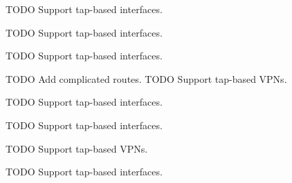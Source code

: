 
\begin{DoxyRefList}
\item[\label{todo__todo000003}%
\Hypertarget{todo__todo000003}%
Member \hyperlink{main_8c_a345bf2d3cf0cd82bcbbba3e054eafd48}{find\+\_\+primary\+\_\+if\+\_\+index} ()]T\+O\+DO Support tap-\/based interfaces. 
\item[\label{todo__todo000004}%
\Hypertarget{todo__todo000004}%
Member \hyperlink{main_8c_a6f5d8c51479e6196fb3d19e3538a46d0}{get\+\_\+if\+\_\+info} (struct ifaddrs $\ast$ifa, int family, enum I\+F\+\_\+\+T\+R\+A\+V\+E\+R\+S\+E\+\_\+\+M\+O\+DE tr\+\_\+mode)]T\+O\+DO Support tap-\/based interfaces. 
\item[\label{todo__todo000001}%
\Hypertarget{todo__todo000001}%
Member \hyperlink{app-profile_8c_a7ab4018359451259c67e57c83f9b7062}{get\+\_\+openvpn\+\_\+profile\+\_\+name} (char profile\+\_\+name\mbox{[}M\+A\+X\+\_\+\+V\+P\+N\+\_\+\+P\+R\+O\+F\+I\+L\+E\+\_\+\+N\+A\+ME\mbox{]})]T\+O\+DO Support tap-\/based interfaces. 
\item[\label{todo__todo000007}%
\Hypertarget{todo__todo000007}%
Member \hyperlink{main_8c_a25501fb2b3310a216de1ece7fa86e233}{get\+\_\+routes} ()]T\+O\+DO Add complicated routes. T\+O\+DO Support tap-\/based V\+P\+Ns. 
\item[\label{todo__todo000002}%
\Hypertarget{todo__todo000002}%
Member \hyperlink{app-profile_8c_aa32bea11cb1c8f99a45bc62cc8f5e455}{get\+\_\+vpn\+\_\+profile\+\_\+name} (enum V\+P\+N\+\_\+\+M\+E\+T\+H\+O\+DS vpn\+\_\+method, char profile\+\_\+name\mbox{[}M\+A\+X\+\_\+\+V\+P\+N\+\_\+\+P\+R\+O\+F\+I\+L\+E\+\_\+\+N\+A\+ME\mbox{]})]T\+O\+DO Support tap-\/based interfaces. 
\item[\label{todo__todo000008}%
\Hypertarget{todo__todo000008}%
Member \hyperlink{app-profile_8h_a2af00bda795682f62e77417d4969e2e5}{get\+\_\+vpn\+\_\+profile\+\_\+name} (enum V\+P\+N\+\_\+\+M\+E\+T\+H\+O\+DS vpn\+\_\+method, char profile\+\_\+name\mbox{[}M\+A\+X\+\_\+\+V\+P\+N\+\_\+\+N\+A\+ME\mbox{]})]T\+O\+DO Support tap-\/based interfaces. 
\item[\label{todo__todo000006}%
\Hypertarget{todo__todo000006}%
Member \hyperlink{main_8c_a9af8032bea78a008241c6a446021e90b}{public\+\_\+ip\+\_\+retrieve} ()]T\+O\+DO Support tap-\/based V\+P\+Ns. 
\item[\label{todo__todo000005}%
\Hypertarget{todo__todo000005}%
Member \hyperlink{main_8c_a5e3d195dba2da8b65b35a85c7834dfa2}{traverse\+\_\+ifs} (struct ifaddrs $\ast$ifaddr, enum I\+F\+\_\+\+T\+R\+A\+V\+E\+R\+S\+E\+\_\+\+M\+O\+DE tr\+\_\+mode)]T\+O\+DO Support tap-\/based interfaces.
\end{DoxyRefList}
